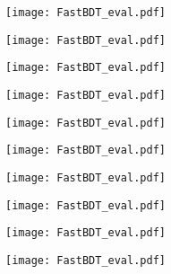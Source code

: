 \begin{figure}[H]
\ContinuedFloat
\begin{subfigure}{0.5\linewidth}
	\texttt{[image: FastBDT\_eval.pdf]}
\end{subfigure}
\begin{subfigure}{0.5\linewidth}
	\texttt{[image: FastBDT\_eval.pdf]}
\end{subfigure}
\begin{subfigure}{0.5\linewidth}
	\texttt{[image: FastBDT\_eval.pdf]}
\end{subfigure}
\begin{subfigure}{0.5\linewidth}
	\texttt{[image: FastBDT\_eval.pdf]}
\end{subfigure}
\begin{subfigure}{0.5\linewidth}
	\texttt{[image: FastBDT\_eval.pdf]}
\end{subfigure}
\begin{subfigure}{0.5\linewidth}
	\texttt{[image: FastBDT\_eval.pdf]}
\end{subfigure}
\begin{subfigure}{0.5\linewidth}
	\texttt{[image: FastBDT\_eval.pdf]}
\end{subfigure}
\begin{subfigure}{0.5\linewidth}
	\texttt{[image: FastBDT\_eval.pdf]}
\end{subfigure}
\begin{subfigure}{0.5\linewidth}
	\texttt{[image: FastBDT\_eval.pdf]}
\end{subfigure}
\begin{subfigure}{0.5\linewidth}
	\texttt{[image: FastBDT\_eval.pdf]}
\end{subfigure}
\end{figure}

